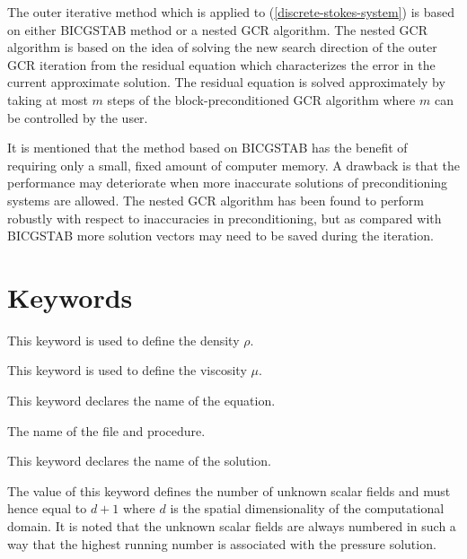 \begin{versiona}
The outer iterative method which is applied to (\ref{discrete-stokes-system})
is based on either BICGSTAB method or a nested GCR algorithm.
The nested GCR algorithm is based on the idea of solving the new search direction
of the outer GCR iteration from the residual equation which characterizes the 
error in the current approximate solution. The residual equation is solved 
approximately by taking at most $m$ steps of the block-preconditioned GCR algorithm
where $m$ can be controlled by the user.

It is mentioned that 
the method based on BICGSTAB has the benefit of requiring only a small, fixed amount 
of computer memory. A drawback is that the performance may deteriorate when
more inaccurate solutions of preconditioning systems are allowed. 
The nested GCR algorithm has been found to perform robustly with respect to 
inaccuracies in preconditioning, but as compared with BICGSTAB more solution
vectors may need to be saved during the iteration.  


 
  
  
 


\section{Keywords}
\end{versiona}

\sifbegin
{}
\sifbegin
{} 
This keyword is used to define the density $\rho$.

This keyword is used to define the viscosity $\mu$.

\sifend
\sifend


\sifbegin
{}
\sifbegin

This keyword declares the name of the equation.

The name of the file and procedure.

This keyword declares the name of the solution.

The value of this keyword defines the number of unknown scalar fields
and must hence equal to $d+1$ where $d$ is the spatial 
dimensionality of the computational domain.
It is noted that the unknown scalar fields are always numbered in such a
way that the highest running number is associated with the pressure
solution. 

